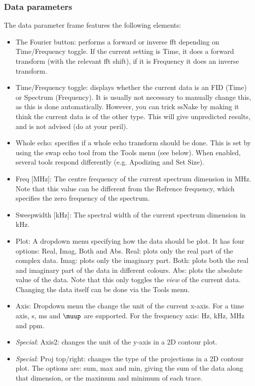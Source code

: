 \documentclass[11pt,a4paper]{article}
\begin{document}
\subsubsection*{Data parameters}
The data parameter frame features the following elements:
\begin{itemize}
\item The Fourier button: performs a forward or inverse fft depending on Time/Frequency toggle. If the current setting is Time, it does a forward transform (with the relevant fft shift), if it is Frequency it does an inverse transform.
\item Time/Frequency toggle: displays whether the current data is an FID (Time) or Spectrum (Frequency). It is usually not necessary to manually change this, as this is done automatically. However, you can trick ssNake by making it think the current data is of the other type. This will give unpredicted results, and is not advised (do at your peril).
\item Whole echo: specifies if a whole echo transform should be done. This is set by using the swap echo tool from the Tools menu (see below). When enabled, several tools respond differently (e.g. Apodizing and Set Size).
\item Freq [MHz]: The centre frequency of the current spectrum dimension in MHz. Note that this value can be different from the Refrence frequency, which specifies the zero frequency of the spectrum.
\item Sweepwidth [kHz]: The spectral width of the current spectrum dimension in kHz. 
\item Plot: A dropdown menu specifying how the data should be plot. It has four options: Real, Imag, Both and Abs. Real: plots only the real part of the complex data. Imag: plots only the imaginary part. Both: plots both the real and imaginary part of the data in different colours. Abs: plots the absolute value of the data. Note that this only toggles the \textit{view} of the current data. Changing the data itself can be done via the Tools menu.
\item Axis: Dropdown menu the change the unit of the current x-axis. For a time axis, s, ms and $\muup$ are supported. For the frequency axis: Hz, kHz, MHz and ppm.
\item \textit{Special}: Axis2: changes the unit of the y-axis in a 2D contour plot.
\item \textit{Special}: Proj top/right: changes the type of the projections in a 2D contour plot. The options are: sum, max and min, giving the sum of the data along that dimension, or the maximum and minimum of each trace.
\end{itemize}
\end{document}
